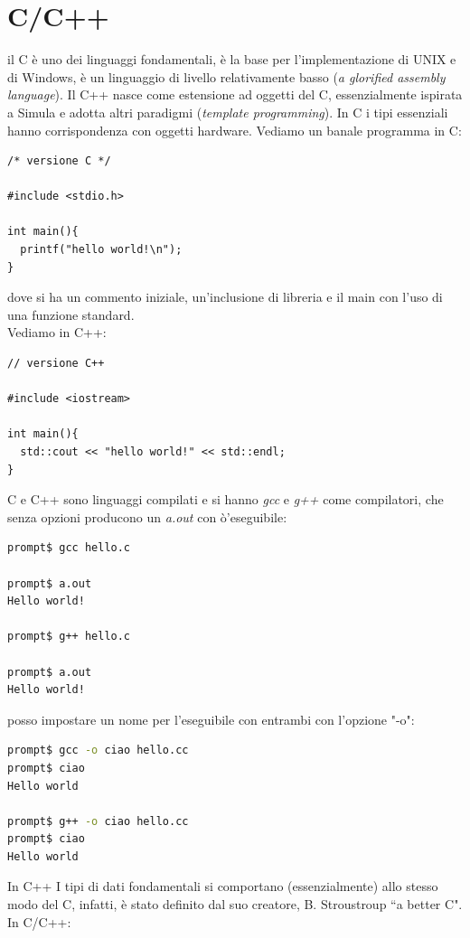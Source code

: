 \documentclass[a4paper,12pt, oneside]{book}
\begin{document}
\chapter{C/C++}
il C è uno dei linguaggi fondamentali, è la base per l'implementazione di UNIX e di Windows, è un linguaggio di livello relativamente basso (\textit{a glorified assembly
language}). Il C++ nasce come estensione ad oggetti del C, essenzialmente ispirata a Simula e adotta altri paradigmi (\textit{template programming}). In C i tipi essenziali hanno corrispondenza con oggetti hardware. Vediamo un banale programma in C:
\begin{verbatim}
/* versione C */

#include <stdio.h>

int main(){
  printf("hello world!\n");
}
\end{verbatim}
dove si ha un commento iniziale, un'inclusione di libreria e il main con l'uso di una funzione standard.\\ Vediamo in C++:
\begin{verbatim}
// versione C++ 

#include <iostream>

int main(){
  std::cout << "hello world!" << std::endl;
}
\end{verbatim}
C e C++ sono linguaggi compilati e si hanno \textit{gcc} e \textit{g++} come compilatori, che senza opzioni producono un \textit{a.out }con ò'eseguibile:
\begin{shaded}
\begin{lstlisting}[language=bash]
prompt$ gcc hello.c

prompt$ a.out
Hello world!

prompt$ g++ hello.c

prompt$ a.out
Hello world!
\end{lstlisting}
\end{shaded}
posso impostare un nome per l'eseguibile con entrambi con l'opzione "-o":
\begin{shaded}
\begin{lstlisting}[language=bash]
prompt$ gcc -o ciao hello.cc
prompt$ ciao
Hello world

prompt$ g++ -o ciao hello.cc
prompt$ ciao
Hello world
\end{lstlisting}
\end{shaded}
In C++ I tipi di dati fondamentali si comportano (essenzialmente) allo stesso modo del C, infatti, è stato definito dal suo creatore, B. Stroustroup
“a better C".
\\
In C/C++:
\end{document}
